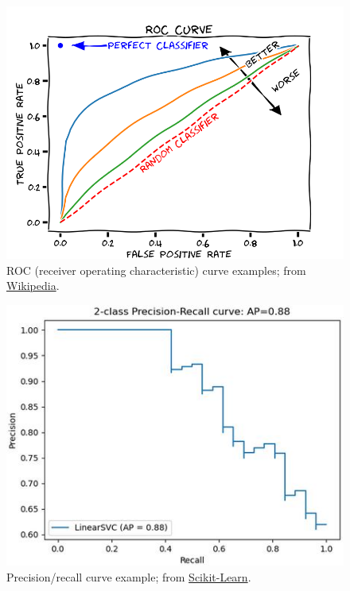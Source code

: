 \documentclass[]{article}
\begin{document}
\begin{figure}[H]
	\centering\includegraphics[scale=0.3]{roc_curve}
	\caption{ROC (receiver operating characteristic) curve examples; from \href{https://en.wikipedia.org/wiki/Receiver_operating_characteristic}{Wikipedia}.}
\end{figure} 

\begin{figure}[H]
	\centering\includegraphics[scale=0.6]{precision_recall}
	\caption{Precision/recall curve example; from \href{https://scikit-learn.org/stable/auto_examples/model_selection/plot_precision_recall.html}{Scikit-Learn}.}
\end{figure} 
\end{document}
